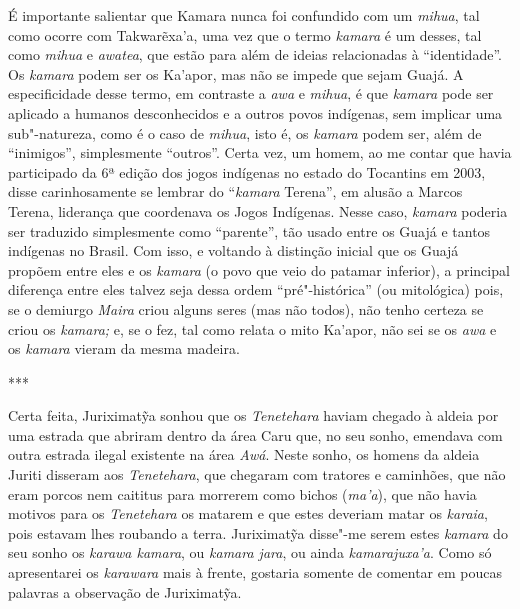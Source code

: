 É importante salientar que Kamara nunca foi confundido com um
\emph{mihua}, tal como ocorre com Takwarẽxa'a, uma vez que o termo
\emph{kamara} é um desses, tal como \emph{mihua} e \emph{awatea}, que
estão para além de ideias relacionadas à ``identidade''. Os \emph{kamara}
podem ser os Ka'apor, mas não se impede que sejam Guajá. A
especificidade desse termo, em contraste a \emph{awa} e \emph{mihua}, é
que \emph{kamara} pode ser aplicado a humanos desconhecidos e a outros
povos indígenas, sem implicar uma sub"-natureza, como é o caso de
\emph{mihua}, isto é, os \emph{kamara} podem ser, além de ``inimigos'',
simplesmente ``outros''. Certa vez, um homem, ao me contar que havia
participado da 6ª edição dos jogos indígenas no estado do Tocantins em
2003, disse carinhosamente se lembrar do ``\emph{kamara} Terena'', em
alusão a Marcos Terena, liderança que coordenava os Jogos Indígenas.
Nesse caso, \emph{kamara} poderia ser traduzido simplesmente como
``parente'', tão usado entre os Guajá e tantos indígenas no Brasil. Com
isso, e voltando à distinção inicial que os Guajá propõem entre eles e
os \emph{kamara} (o povo que veio do patamar inferior), a principal
diferença entre eles talvez seja dessa ordem ``pré"-histórica'' (ou
mitológica) pois, se o demiurgo \emph{Maira} criou alguns seres (mas não
todos), não tenho certeza se criou os \emph{kamara;} e, se o fez, tal
como relata o mito Ka'apor, não sei se os \emph{awa} e os \emph{kamara}
vieram da mesma madeira.

\begin{center}
***
\end{center}

Certa feita, Juriximatỹa sonhou que os \emph{Tenetehara} haviam chegado
à aldeia por uma estrada que abriram dentro da área Caru que, no seu
sonho, emendava com outra estrada ilegal existente na área \emph{Awá}.
Neste sonho, os homens da aldeia Juriti disseram aos \emph{Tenetehara},
que chegaram com tratores e caminhões, que não eram porcos nem caititus
para morrerem como bichos (\emph{ma'a}), que não havia motivos para os
\emph{Tenetehara} os matarem e que estes deveriam matar os
\emph{karaia}, pois estavam lhes roubando a terra. Juriximatỹa disse"-me
serem estes \emph{kamara} do seu sonho os \emph{karawa kamara}, ou
\emph{kamara jara}, ou ainda \emph{kamarajuxa'a}. Como só apresentarei
os \emph{karawara} mais à frente, gostaria somente de comentar em poucas
palavras a observação de Juriximatỹa.

